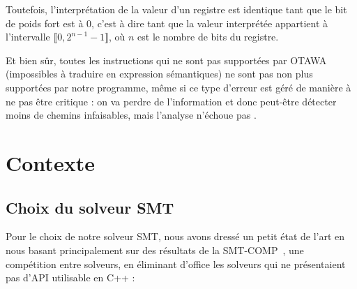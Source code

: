 \documentclass[french]{article}
\newcommand\ccc[1]{\color{red}{#1}\color{black}} %
\begin{document}
  Toutefois, l'interprétation de la valeur d'un registre est identique tant que le bit de poids fort est à 0, c'est à dire tant que la valeur interprétée appartient à l'intervalle $\llbracket0, 2^{n-1}-1\rrbracket$, où $n$ est le nombre de bits du registre.

  Et bien sûr, toutes les instructions qui ne sont pas supportées par OTAWA (impossibles à traduire en expression sémantiques) ne sont pas non plus supportées par notre programme, même si ce type d'erreur est géré de manière à ne pas être critique : on va perdre de l'information et donc peut-être détecter moins de chemins infaisables, mais l'analyse n'échoue pas \ccc{et ne donne pas de faux résultats}.

  \newpage{}
  \section{Contexte}
  \ccc{
  Nous commençons par introduire les outils, théoriques ou concrets, sur lesquels nous allons nous appuyer pour notre analyse.
  }
  
  \subsection{Choix du solveur SMT}
  Pour le choix de notre solveur SMT, nous avons dressé un petit état de l'art en nous basant principalement sur des résultats de la SMT-COMP~\cite{SMT-COMP}, une compétition entre solveurs, en éliminant d'office les solveurs qui ne présentaient pas d'API utilisable en C++ \ccc{puisque le framework OTAWA est en C++} :
\end{document}
